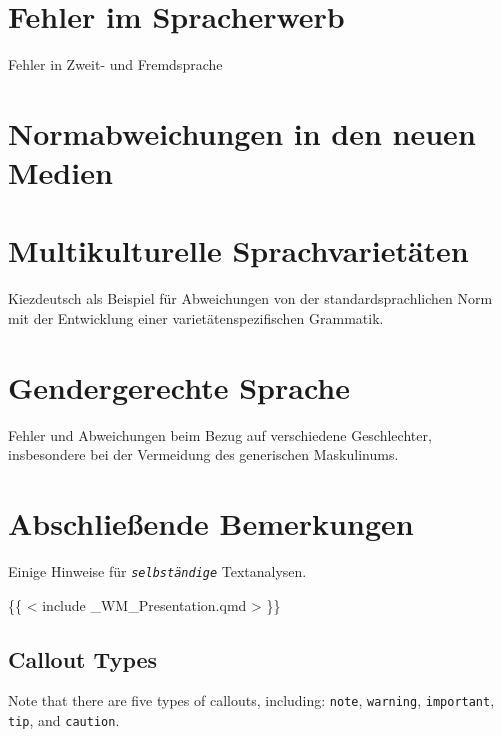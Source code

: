 \documentclass[
  letterpaper,
]{scrbook}
\begin{document}
\hypertarget{sec-spracherwerb}{%
\chapter{Fehler im Spracherwerb}\label{sec-spracherwerb}}

Fehler in Zweit- und Fremdsprache

\hypertarget{sec-medien}{%
\chapter{Normabweichungen in den neuen Medien}\label{sec-medien}}

\hypertarget{sec-multikulti}{%
\chapter{Multikulturelle Sprachvarietäten}\label{sec-multikulti}}

Kiezdeutsch als Beispiel für Abweichungen von der standardsprachlichen
Norm mit der Entwicklung einer varietätenspezifischen Grammatik.

\hypertarget{sec-gender}{%
\chapter{Gendergerechte Sprache}\label{sec-gender}}

Fehler und Abweichungen beim Bezug auf verschiedene Geschlechter,
insbesondere bei der Vermeidung des generischen Maskulinums.


\hypertarget{abschlieuxdfende-bemerkungen}{%
\chapter{Abschließende Bemerkungen}\label{abschlieuxdfende-bemerkungen}}

Einige Hinweise für \emph{\texttt{selbständige}} Textanalysen. 🤗

\{\{ \textless{} include \_WM\_Presentation.qmd \textgreater{} \}\}

\hypertarget{callout-types}{%
\section{Callout Types}\label{callout-types}}

\begin{tcolorbox}[enhanced jigsaw, coltitle=black, left=2mm, breakable, arc=.35mm, toprule=.15mm, colback=white, opacityback=0, bottomrule=.15mm, leftrule=.75mm, titlerule=0mm, bottomtitle=1mm, toptitle=1mm, title=\textcolor{quarto-callout-note-color}{\faInfo}\hspace{0.5em}{Note}, colbacktitle=quarto-callout-note-color!10!white, rightrule=.15mm, opacitybacktitle=0.6, colframe=quarto-callout-note-color-frame]

Note that there are five types of callouts, including: \texttt{note},
\texttt{warning}, \texttt{important}, \texttt{tip}, and
\texttt{caution}.

\end{tcolorbox}
\end{document}
